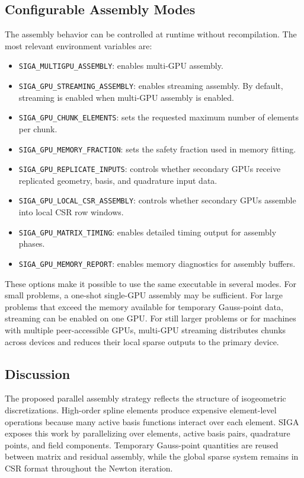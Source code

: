 \documentclass[11pt]{article}
\begin{document}
\subsection{Configurable Assembly Modes}

The assembly behavior can be controlled at runtime without recompilation. The most relevant environment variables are:
\begin{itemize}
    \item \texttt{SIGA\_MULTIGPU\_ASSEMBLY}: enables multi-GPU assembly.
    \item \texttt{SIGA\_GPU\_STREAMING\_ASSEMBLY}: enables streaming assembly. By default, streaming is enabled when multi-GPU assembly is enabled.
    \item \texttt{SIGA\_GPU\_CHUNK\_ELEMENTS}: sets the requested maximum number of elements per chunk.
    \item \texttt{SIGA\_GPU\_MEMORY\_FRACTION}: sets the safety fraction used in memory fitting.
    \item \texttt{SIGA\_GPU\_REPLICATE\_INPUTS}: controls whether secondary GPUs receive replicated geometry, basis, and quadrature input data.
    \item \texttt{SIGA\_GPU\_LOCAL\_CSR\_ASSEMBLY}: controls whether secondary GPUs assemble into local CSR row windows.
    \item \texttt{SIGA\_GPU\_MATRIX\_TIMING}: enables detailed timing output for assembly phases.
    \item \texttt{SIGA\_GPU\_MEMORY\_REPORT}: enables memory diagnostics for assembly buffers.
\end{itemize}

These options make it possible to use the same executable in several modes. For small problems, a one-shot single-GPU assembly may be sufficient. For large problems that exceed the memory available for temporary Gauss-point data, streaming can be enabled on one GPU. For still larger problems or for machines with multiple peer-accessible GPUs, multi-GPU streaming distributes chunks across devices and reduces their local sparse outputs to the primary device.

\subsection{Discussion}

The proposed parallel assembly strategy reflects the structure of isogeometric discretizations. High-order spline elements produce expensive element-level operations because many active basis functions interact over each element. SIGA exposes this work by parallelizing over elements, active basis pairs, quadrature points, and field components. Temporary Gauss-point quantities are reused between matrix and residual assembly, while the global sparse system remains in CSR format throughout the Newton iteration.
\end{document}
